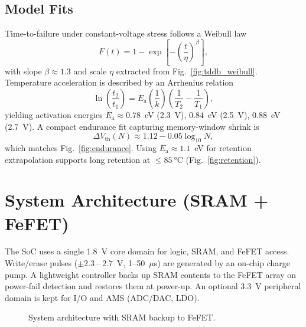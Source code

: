 \documentclass[conference]{IEEEtran}
\newcommand{\Vth}{V_{\mathrm{th}}}
\newcommand{\Ea}{E_{\mathrm{a}}}
\newcommand{\betaW}{\beta} %
\newcommand{\etaW}{\eta}   %
\begin{document}
\subsection{Model Fits}
Time-to-failure under constant-voltage stress follows a Weibull law
\begin{equation}
  F(t)=1-\exp\!\left[-\left(\frac{t}{\etaW}\right)^{\betaW}\right],
\end{equation}
with slope $\betaW \approx 1.3$ and scale $\etaW$ extracted from Fig.~\ref{fig:tddb_weibull}.
Temperature acceleration is described by an Arrhenius relation
\begin{equation}
  \ln\!\left(\frac{t_2}{t_1}\right)=\Ea\!\left(\frac{1}{k}\right)\!\left(\frac{1}{T_2}-\frac{1}{T_1}\right),
\end{equation}
yielding activation energies $\Ea \approx 0.78$~eV (2.3~V), $0.84$~eV (2.5~V), $0.88$~eV (2.7~V).
A compact endurance fit capturing memory-window shrink is
\begin{equation}
  \Delta \Vth(N) \approx 1.12 - 0.05\log_{10} N,
\end{equation}
which matches Fig.~\ref{fig:endurance}.
Using $\Ea \approx 1.1$~eV for retention extrapolation supports long retention at $\le \SI{85}{\celsius}$ (Fig.~\ref{fig:retention}).

\section{System Architecture (SRAM + FeFET)}
The SoC uses a single 1.8~V core domain for logic, SRAM, and FeFET access.
Write/erase pulses ($\pm$2.3$~$--$~2.7$~V, 1--50~$\mu$s) are generated by an on-chip charge pump.
A lightweight controller backs up SRAM contents to the FeFET array on power-fail detection and restores them at power-up.
An optional 3.3~V peripheral domain is kept for I/O and AMS (ADC/DAC, LDO).

\begin{figure}[!t]
  \centering
  \caption{System architecture with SRAM backup to FeFET.}
  \label{fig:system}
\end{figure}
\end{document}
